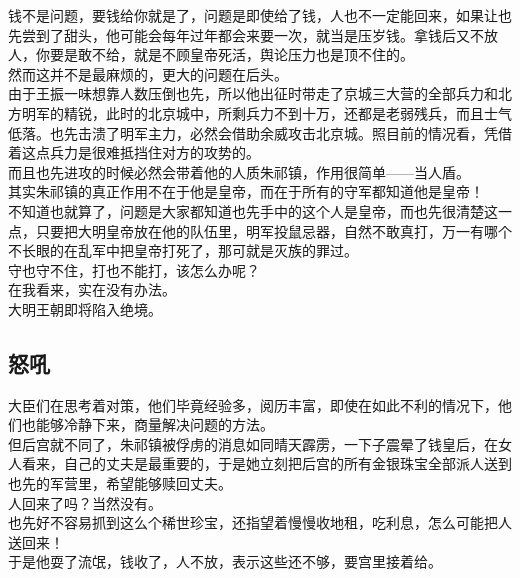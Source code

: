 \begin{multicols}{\theparacolNo}
钱不是问题，要钱给你就是了，问题是即使给了钱，人也不一定能回来，如果让也先尝到了甜头，他可能会每年过年都会来要一次，就当是压岁钱。拿钱后又不放人，你要是敢不给，就是不顾皇帝死活，舆论压力也是顶不住的。\\

然而这并不是最麻烦的，更大的问题在后头。\\

由于王振一味想靠人数压倒也先，所以他出征时带走了京城三大营的全部兵力和北方明军的精锐，此时的北京城中，所剩兵力不到十万，还都是老弱残兵，而且士气低落。也先击溃了明军主力，必然会借助余威攻击北京城。照目前的情况看，凭借着这点兵力是很难抵挡住对方的攻势的。\\

而且也先进攻的时候必然会带着他的人质朱祁镇，作用很简单——当人盾。\\

其实朱祁镇的真正作用不在于他是皇帝，而在于所有的守军都知道他是皇帝！\\

不知道也就算了，问题是大家都知道也先手中的这个人是皇帝，而也先很清楚这一点，只要把大明皇帝放在他的队伍里，明军投鼠忌器，自然不敢真打，万一有哪个不长眼的在乱军中把皇帝打死了，那可就是灭族的罪过。\\

守也守不住，打也不能打，该怎么办呢？\\

在我看来，实在没有办法。\\

大明王朝即将陷入绝境。\\

\subsection{怒吼}
大臣们在思考着对策，他们毕竟经验多，阅历丰富，即使在如此不利的情况下，他们也能够冷静下来，商量解决问题的方法。\\

但后宫就不同了，朱祁镇被俘虏的消息如同晴天霹雳，一下子震晕了钱皇后，在女人看来，自己的丈夫是最重要的，于是她立刻把后宫的所有金银珠宝全部派人送到也先的军营里，希望能够赎回丈夫。\\

人回来了吗？当然没有。\\

也先好不容易抓到这么个稀世珍宝，还指望着慢慢收地租，吃利息，怎么可能把人送回来！\\

于是他耍了流氓，钱收了，人不放，表示这些还不够，要宫里接着给。\\


\end{multicols}

